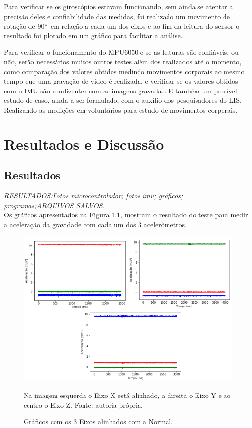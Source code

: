 	Para verificar se os giroscópios estavam funcionando, sem ainda se atentar a precisão deles e confiabilidade das medidas, foi realizado um movimento de rotação de 90$ \degree $ em relação a cada um dos eixos e ao fim da leitura do sensor o resultado foi plotado em um gráfico para facilitar a análise.
	
	Para verificar o funcionamento do MPU6050  e se as leituras são confiáveis, ou não, serão necessários muitos outros testes além dos realizados até o momento, como comparação dos valores obtidos medindo movimentos corporais ao mesmo tempo que uma gravação de video é realizada, e verificar se os valores obtidos com o IMU são condizentes com as imagens gravadas. E também um possível estudo de caso, ainda a ser formulado, com o auxílio dos pesquisadores do LIS. Realizando as medições em voluntários para estudo de movimentos corporais. 
	
	
\chapter{Resultados e Discussão}
	\section{Resultados}
	\textit{RESULTADOS:Fotos microcontrolador; fotos imu; gráficos; programas;ARQUIVOS SALVOS.}\\
	
	Os gráficos apresentados na Figura \ref{acelx_0}, mostram o resultado do teste para medir a aceleração da gravidade com cada um dos 3 acelerômetros.
	
	\begin{figure}[h]
		\centering
		\includegraphics[keepaspectratio=true,scale=0.6]{figuras/graficos_acel.png}
		\caption{Gráficos com os 3 Eixos alinhados com a Normal.}
		Na imagem esquerda o Eixo X está alinhado, a direita o Eixo Y e ao centro o Eixo Z. \footnotesize
		Fonte: autoria própria. 
		\label{acelx_0}	
	\end{figure}		

